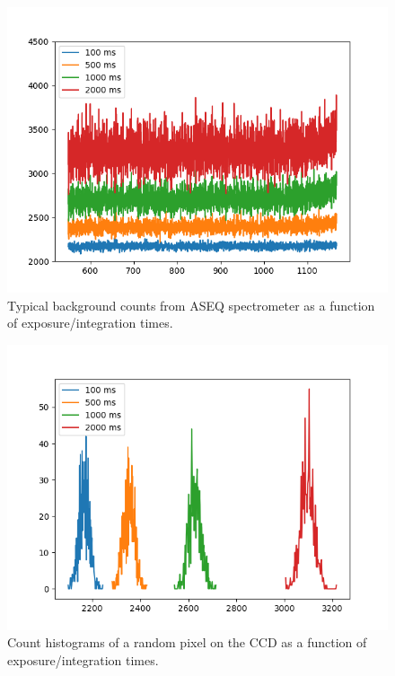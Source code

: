 \begin{figure}[H]
	\centering
	\includegraphics[angle=0,origin=c,width = 1.0\linewidth]{Section_ODMR/Figures/BGCounts_AsFunctionOfIntegrationTime.png}
	\caption{Typical background counts from ASEQ spectrometer as a function of exposure/integration times.}
	\label{fig:BGasIntTimes}
\end{figure}

\begin{figure}[H]
	\centering
	\includegraphics[angle=0,origin=c,width = 1.0\linewidth]{Section_ODMR/Figures/Pixel2550TimeEvolutionOfCounts.png}
	\caption{Count histograms of a random pixel on the CCD as a function of exposure/integration times.}
	\label{fig:BGofRandomPixelasIntTimes}
\end{figure}

